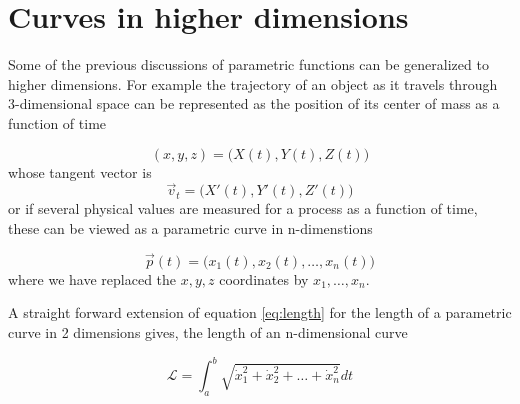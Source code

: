 \section{Curves in higher dimensions}

Some of the previous discussions of parametric functions can be 
generalized to higher dimensions. For example the trajectory of 
an object as it travels through 3-dimensional space can be
represented as the position of its center of mass as a function 
of time

$$
   (x,y,z) = \big(X(t), Y(t), Z(t)\big)
$$
whose tangent vector is 
$$
    \vec{v}_t = \big(X'(t), Y'(t), Z'(t)\big)
$$
or if several physical values are measured for a process as a function of time, these 
can be viewed as a parametric curve in n-dimenstions

$$
   \vec{p}(t) = \big(x_1(t), x_2(t), \ldots, x_n(t)\big)
$$
where we have replaced the $x,y,z$ coordinates by $x_1,\ldots,x_n$.

A straight forward extension of equation \ref{eq:length} for the length of a parametric curve in 
2 dimensions gives, the length of an n-dimensional curve  

$$
  \mathcal{L} =  \int_a^b\sqrt{\dot{x}_1^2 + \dot{x}_2^2 + \ldots + \dot{x}_n^2 } dt
$$


